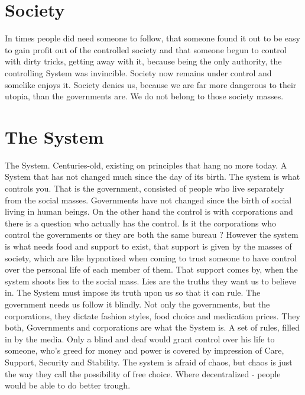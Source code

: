 \documentclass[letterpaper,12pt,english]{sphinxmanual}
\begin{document}
\section{Society}
\label{2003:society}
In times people did need someone to follow, that someone found it out to be easy to gain profit out of the controlled society and that someone begun to control with dirty tricks, getting away with it, because being the only authority, the controlling System was invincible. Society now remains under control and somelike enjoys it.
Society denies us, because we are far more dangerous to their utopia, than the governments are. We do not belong to those society masses.


\section{The System}
\label{2003:the-system}
The System. Centuries-old, existing on principles that hang no more today. A System that has not changed much since the day of its birth. The system is what controls you. That is the government, consisted of people who live separately from the social masses. Governments have not changed since the birth of social living in human beings. On the other hand the control is with corporations and there is a question who actually has the control. Is it the corporations who control the governments or they are both the same bureau ? However the system is what needs food and support to exist, that support is given by the masses of society, which are like hypnotized when coming to trust someone to have control over the personal life of each member of them. That support comes by, when the system shoots lies to the social mass. Lies are the truths they want us to believe in. The System must impose its truth upon us so that it can rule. The government needs us follow it blindly. Not only the governments, but the corporations, they dictate fashion styles, food choice and medication prices. They both, Governments and corporations are what the System is. A set of rules, filled in by the media. Only a blind and deaf would grant control over his life to someone, who's greed for money and power is covered by impression of Care, Support, Security and Stability. The system is afraid of chaos, but chaos is just the way they call the possibility of free choice. Where decentralized - people would be able to do better trough.
\end{document}
